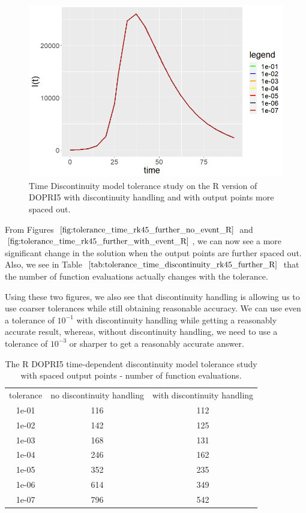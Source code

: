 \begin{figure}[H]
\centering
\includegraphics[width=0.7\linewidth]{./figures/tolerance_time_rk45_further_with_event_R}
\caption{Time Discontinuity model tolerance study on the R version of DOPRI5 with discontinuity handling and with output points more spaced out.}
\label{fig:tolerance_time_rk45_further_with_event_R}
\end{figure}

From Figures $\ref{fig:tolerance_time_rk45_further_no_event_R}$ and $\ref{fig:tolerance_time_rk45_further_with_event_R}$, we can now see a more significant change in the solution when the output points are further spaced out. Also, we see in Table $\ref{tab:tolerance_time_discontinuity_rk45_further_R}$ that the number of function evaluations actually changes with the tolerance.

Using these two figures, we also see that discontinuity handling is allowing us to use coarser tolerances while still obtaining reasonable accuracy. We can use even a tolerance of $10^{-1}$ with discontinuity handling while getting a reasonably accurate result, whereas, without discontinuity handling, we need to use a tolerance of $10^{-3}$ or sharper to get a reasonably accurate answer.

\begin{table}[H]
\caption {The R DOPRI5 time-dependent discontinuity model tolerance study with spaced output points - number of function evaluations.} \label{tab:tolerance_time_discontinuity_rk45_further_R} 
\begin{center}
\begin{tabular}{ c c c }
tolerance & no discontinuity handling & with discontinuity handling \\ 
1e-01 & 116 & 112 \\
1e-02 & 142 & 125 \\
1e-03 & 168 & 131 \\
1e-04 & 246 & 162 \\
1e-05 & 352 & 235 \\
1e-06 & 614 & 349 \\
1e-07 & 796 & 542 \\
\end{tabular}
\end{center}
\end{table}

